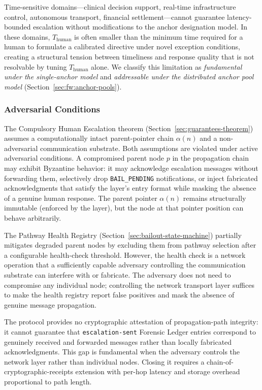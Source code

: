 Time-sensitive domains---clinical decision support, real-time infrastructure control, autonomous transport, financial settlement---cannot guarantee latency-bounded escalation without modifications to the anchor designation model. In these domains, $T_{\text{human}}$ is often smaller than the minimum time required for a human to formulate a calibrated directive under novel exception conditions, creating a structural tension between timeliness and response quality that is not resolvable by tuning $T_{\text{human}}$ alone. We classify this limitation as \emph{fundamental under the single-anchor model} and \emph{addressable under the distributed anchor pool model} (Section~\ref{sec:fw:anchor-pools}).

\subsubsection{Adversarial Conditions}
\label{sec:lim:adversarial}

The Compulsory Human Escalation theorem (Section~\ref{sec:guarantees-theorem}) assumes a computationally intact parent-pointer chain $\alpha(n)$ and a non-adversarial communication substrate. Both assumptions are violated under active adversarial conditions. A compromised parent node $p$ in the propagation chain may exhibit Byzantine behavior: it may acknowledge escalation messages without forwarding them, selectively drop \texttt{BAIL\_PENDING} notifications, or inject fabricated acknowledgments that satisfy the \fact{} layer's entry format while masking the absence of a genuine human response. The parent pointer $\alpha(n)$ remains structurally immutable (enforced by the \fact{} layer), but the node at that pointer position can behave arbitrarily.

The Pathway Health Registry (Section~\ref{sec:bailout-state-machine}) partially mitigates degraded parent nodes by excluding them from pathway selection after a configurable health-check threshold. However, the health check is a network operation that a sufficiently capable adversary controlling the communication substrate can interfere with or fabricate. The adversary does not need to compromise any individual node; controlling the network transport layer suffices to make the health registry report false positives and mask the absence of genuine message propagation.

The protocol provides no cryptographic attestation of propagation-path integrity: it cannot guarantee that \texttt{escalation-sent} Forensic Ledger entries correspond to genuinely received and forwarded messages rather than locally fabricated acknowledgments. This gap is fundamental when the adversary controls the network layer rather than individual nodes. Closing it requires a chain-of-cryptographic-receipts extension with per-hop latency and storage overhead proportional to path length.

